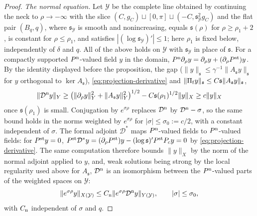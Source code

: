 \documentclass[11pt]{amsart}
\theoremstyle{definition}
\theoremstyle{remark}
\theoremstyle{plain}
\numberwithin{equation}{section}
\begin{document}
\begin{proof}
\emph{The normal equation.} Let $\mathcal Y$ be the complete line obtained by
continuing the neck to $\rho\to-\infty$ with the slice
$(C,g_C)\sqcup[0,\pi]\sqcup(-C,{\mathfrak s}_{\mathcal Y}^2g_C)$ and the flat pair $(B_q,q)$, where
${\mathfrak s}_{\mathcal Y}$ is smooth and nonincreasing, equals ${\mathfrak s}(\rho)$ for
$\rho\ge\rho_1+2$, is constant for $\rho\le\rho_1$, and satisfies
$|(\log{\mathfrak s}_{\mathcal Y})'|\le1$; here $\rho_1$ is fixed below, independently of
$\delta$ and $q$. All of the above holds on $\mathcal Y$ with ${\mathfrak s}_{\mathcal Y}$ in place
of ${\mathfrak s}$. For a compactly supported $P^{\rm n}$-valued field $y$ in the domain,
$P^{\rm n}\partial_\rho y=\partial_\rho y+(\partial_\rho P^{\rm st})y$. By the identity
displayed before the proposition, the gap ($\|y\|_{\mathfrak s}\le\gamma^{-1}\|A_{\mathfrak s} y\|_{\mathfrak s}$ for
$y$ orthogonal to $\ker A_{\mathfrak s}$), \eqref{eq:projection-derivative} and $\|\Pi_{\rm f}y\|_{\mathfrak s}\le
C{\mathfrak s}\|A_{\mathfrak s} y\|_{\mathfrak s}$,
\[
\|\mathcal D^{\rm n}y\|_Y\ge\bigl(\|\partial_\rho y\|_Y^2+\|A_{\mathfrak s} y\|_Y^2\bigr)^{1/2}
-C{\mathfrak s}(\rho_1)^{1/2}\|y\|_X\ge c\|y\|_X
\]
once ${\mathfrak s}(\rho_1)$ is small. Conjugation by $e^{\sigma\rho}$ replaces $\mathcal D^{\rm n}$ by
$\mathcal D^{\rm n}-\sigma$, so the same bound holds in the norms weighted by
$e^{\sigma\rho}$ for $|\sigma|\le\sigma_0:=c/2$, with a constant independent of $\sigma$.
The formal adjoint $\mathcal D^*$ maps $P^{\rm n}$-valued fields to $P^{\rm n}$-valued
fields: for $P^{\rm st}y=0$, $P^{\rm st}\mathcal D^*y=(\partial_\rho P^{\rm
st})y-(\log{\mathfrak s})'P^{\rm st}P_cy=0$ by \eqref{eq:projection-derivative}. The same
computation therefore bounds $\|y\|_X$ by the norm of the normal adjoint applied to $y$,
and, weak solutions being strong by the local regularity used above for $A_{\mathfrak s}$,
$\mathcal D^{\rm n}$ is an isomorphism between the $P^{\rm n}$-valued parts of the
weighted spaces on $\mathcal Y$:
\begin{equation}\label{eq:normal-estimate}
\|e^{\sigma\rho}y\|_{X(\mathcal Y)}\le C_{\rm n}\|e^{\sigma\rho}\mathcal D^{\rm
n}y\|_{Y(\mathcal Y)},\qquad|\sigma|\le\sigma_0,
\end{equation}
with $C_{\rm n}$ independent of $\sigma$ and $q$.


\end{proof}
\end{document}
